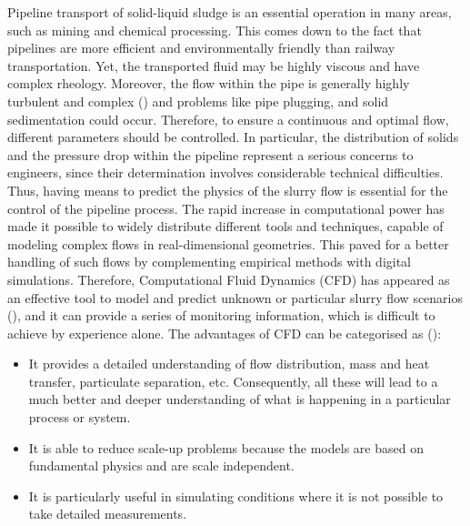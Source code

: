 \documentclass[review,3p,times,12pt]{elsarticle}
\begin{document}
Pipeline transport of solid-liquid sludge is an essential operation in many areas, such as mining and chemical processing. This comes down to the fact that pipelines are more efficient and environmentally friendly than railway transportation. Yet, the transported fluid may be highly viscous and have complex rheology. Moreover, the flow within the pipe is  generally highly turbulent and complex (\citet{Lahiri-2010}) and problems like pipe plugging, and solid sedimentation could occur. Therefore, to ensure a continuous and optimal flow, different parameters should be controlled. In particular, the distribution of solids and the pressure drop within the pipeline represent a serious concerns to engineers, since their determination involves considerable technical difficulties. Thus, having means to predict the physics of the slurry flow is essential for the control of the pipeline process. The rapid increase in computational power has made it possible to widely distribute different tools and techniques, capable of modeling complex flows in real-dimensional geometries. This paved for a better handling of such flows by complementing empirical methods with digital simulations. Therefore, Computational Fluid Dynamics (CFD) has appeared as an effective tool to model and predict unknown or particular slurry flow scenarios (\citet{Bi-2002}), and it can provide a series of monitoring information, which is difficult to achieve by experience alone.
The advantages of CFD can be categorised as (\citet{wanot-1996}):
 \begin{itemize}
     \item It provides a detailed understanding of flow distribution, mass and heat transfer, particulate separation, etc. Consequently, all these will lead to a much better and deeper understanding of what is happening in a particular process or system.
     \item It is able to reduce scale-up problems because the models are based on fundamental physics and are scale independent.
     \item It is particularly useful in simulating conditions where it is not possible to take detailed measurements.
 \end{itemize}
\end{document}
